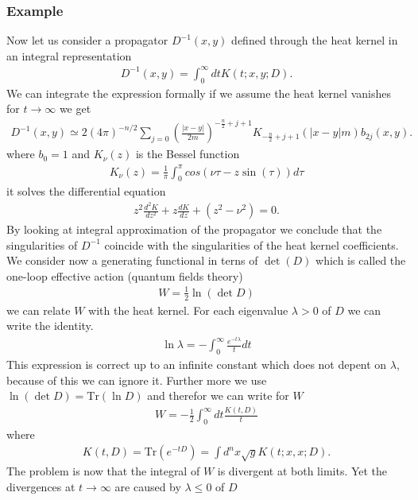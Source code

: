 \subsubsection{Example}
Now let us consider a propagator $D^{-1}(x,y)$ defined through the heat kernel
in an integral representation
\begin{align}
    D^{-1} (x,y) = \int_0^\infty dt K(t;x,y;D).
\end{align}
We can integrate the expression formally if we assume the heat kernel vanishes
for $t\rightarrow \infty$ we get
\begin{align}
    D^{-1}(x,y) \simeq
    2(4\pi)^{-n/2}\sum_{j=0}\left(\frac{|x-y|}{2m}\right)^{-\frac{n}{2}+j+1}
    K_{-\frac{n}{2}+j+1}(|x-y|m)b_{2j}(x,y).
\end{align}
where $b_0 = 1$ and $K_\nu (z)$ is the Bessel function
\begin{align}
    K_\nu(z) = \frac{1}{\pi} \int_0^\pi cos(\nu\tau-z\sin(\tau))d\tau
\end{align}
it solves the differential equation
\begin{align}
    z^2 \frac{d^2K}{dz^2} + z \frac{dK}{dz} + (z^2 - \nu^2)=0.
\end{align}
By looking at integral approximation of the propagator we conclude
that the singularities of $D^{-1}$ coincide with the singularities of the heat
kernel coefficients.
We consider now a generating functional in terns of $\det(D)$ which is called
the one-loop effective action (quantum fields theory)
\begin{align}
    W = \frac{1}{2}\ln(\det D)
\end{align}
we can relate $W$ with the heat kernel. For each eigenvalue $\lambda >0$ of $D$
we can write the identity.
\begin{align}
    \ln \lambda  = -\int_0^\infty \frac{e^{-t\lambda}}{t}dt
\end{align}
This expression is correct up to an infinite constant which does not depent on
$\lambda$, because of this we can ignore it. Further more we use $\ln(\det D) =
\text{Tr}(\ln D)$ and therefor we can write for $W$
\begin{align}
    W = -\frac{1}{2} \int_0^\infty dt \frac{K(t, D)}{t}
\end{align}
where
\begin{align}
    K(t, D) = \text{Tr}(e^{-tD}) = \int d^n x \sqrt{g}K(t;x,x;D).
\end{align}
The problem is now that the integral of $W$ is divergent at both limits. Yet
the divergences at $t\rightarrow \infty$ are caused by $\lambda \leq 0$ of $D$
